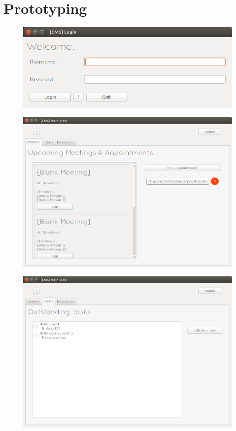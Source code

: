 \section{Prototyping}
	\begin{figure}[H]
		\includegraphics[width=\textwidth]{./Design/proto/1.png}
	\end{figure}
	\begin{figure}[H]
		\includegraphics[width=\textwidth]{./Design/proto/2.png}
	\end{figure}
	\begin{figure}[H]
		\includegraphics[width=\textwidth]{./Design/proto/3.png}
	\end{figure}
